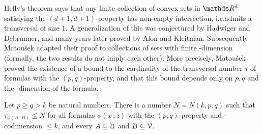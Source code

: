 \documentclass[scombinatorics.tex]{subfiles}
\begin{document}
Helly's theorem says that any finite collection of convex sets in $\RR^d$ satisfying the $(d + 1, d + 1)$-property has non-empty intersection, i.e.\@ admits a transversal of size $1$.
A generalization of this was conjectured by Hadwiger and Debrunner, and many
years later proved by Alon and Kleitman.
Subsequently Matou\v{s}ek adapted their proof to collections of sets with finite \vc-dimension (formally, the two results do not imply each other).
More precisely, Matou\v{s}ek proved the existence of a bound to the cardinality of the transversal number $\tau$ of {\nip} formulas with the $(p,q)$-property, and that this bound depends only on $p,q$ and the \vc-dimension of the formula.

\begin{theorem}
  Let $p\ge q> k$ be natural numbers.
  There is a number $N=N(k,p,q)$ such that 
  $\tau_{\phi(A\,;B)}\le N$ for all formulas $\phi(x\,;z)$ with the $(p,q)$-property and \vc-codimension $\le k$, and every $A\subseteq\EuScript U$ and $B\subseteq\EuScript V$.
\end{theorem}
\end{document}
